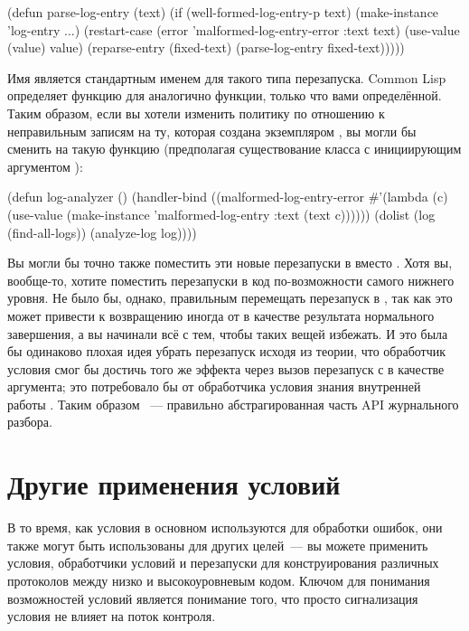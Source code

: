 \begin{myverb}
(defun parse-log-entry (text)
  (if (well-formed-log-entry-p text)
    (make-instance 'log-entry ...)
    (restart-case (error 'malformed-log-entry-error :text text)
      (use-value (value) value)
      (reparse-entry (fixed-text) (parse-log-entry fixed-text)))))
\end{myverb}

Имя  является стандартным именем для такого типа перезапуска. Common Lisp
определяет функцию для  аналогично  функции, только
что вами определённой. Таким образом, если вы хотели изменить политику по отношению к
неправильным записям на ту, которая создана экземпляром , вы
могли бы сменить  на такую функцию (предполагая существование
 класса с инициирующим аргументом ):

\begin{myverb}
(defun log-analyzer ()
  (handler-bind ((malformed-log-entry-error
                  #'(lambda (c)
                      (use-value
                       (make-instance 'malformed-log-entry :text (text c))))))
    (dolist (log (find-all-logs))
      (analyze-log log))))
\end{myverb}

Вы могли бы точно также поместить эти новые перезапуски в  вместо
. Хотя вы, вообще-то, хотите поместить перезапуски в код
по-возможности самого нижнего уровня. Не было бы, однако, правильным перемещать перезапуск
 в , так как это может привести к возвращению
иногда  от  в качестве результата нормального завершения,
а вы начинали всё с тем, чтобы таких вещей избежать. И это была бы одинаково плохая идея
убрать перезапуск  исходя из теории, что обработчик условия смог бы
достичь того же эффекта через вызов перезапуск  с  в качестве
аргумента; это потребовало бы от обработчика условия знания внутренней работы
. Таким образом ~--- правильно абстрагированная
часть API журнального разбора.

\section{Другие применения условий}

В то время, как условия в основном используются для обработки ошибок, они также могут быть
использованы для других целей~--- вы можете применить условия, обработчики условий и
перезапуски для конструирования различных протоколов между низко и высокоуровневым
кодом. Ключом для понимания возможностей условий является понимание того, что просто
сигнализация условия не влияет на поток контроля.

